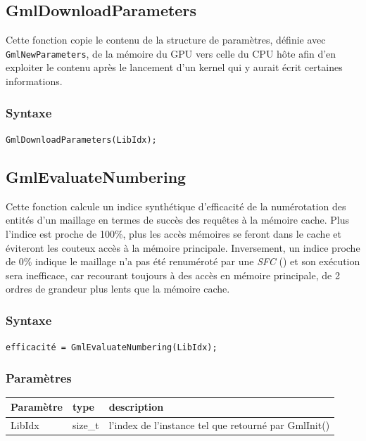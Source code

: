 \documentclass[a4paper,12pt]{article}
\begin{document}
\subsection{GmlDownloadParameters}

Cette fonction copie le contenu de la structure de paramètres, définie avec {\tt GmlNewParameters}, de la mémoire du GPU vers celle du CPU hôte afin d'en exploiter le contenu après le lancement d'un kernel qui y aurait écrit certaines informations.

\subsubsection*{Syntaxe}
{\tt GmlDownloadParameters(LibIdx);}


\subsection{GmlEvaluateNumbering}

Cette fonction calcule un indice synthétique d'efficacité de la numérotation des entités d'un maillage en termes de succès des requêtes à la mémoire cache. Plus l'indice est proche de 100\%, plus les accès mémoires se feront dans le cache et éviteront les couteux accès à la mémoire principale. Inversement, un indice proche de 0\% indique le maillage n'a pas été renuméroté par une \emph{SFC} (\cite{peano_hilbert}) et son exécution sera inefficace, car recourant toujours à des accès en mémoire principale, de 2 ordres de grandeur plus lents que la mémoire cache.

\subsubsection*{Syntaxe}

{\tt efficacité = GmlEvaluateNumbering(LibIdx);}

\subsubsection*{Paramètres}

\begin{tabular}{|m{2cm}|m{1.5cm}|m{10.5cm}|}
\hline
Paramètre  & type    & description \\
\hline
LibIdx     & size\_t & l'index de l'instance tel que retourné par GmlInit() \\
\hline
\end{tabular}

\medskip
\end{document}
